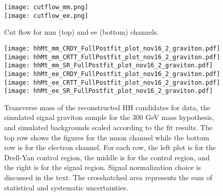 \begin{figure}[tbp]
  \begin{center}
    \texttt{[image: cutflow\_mm.png]}\\
    \texttt{[image: cutflow\_ee.png]}\\
    \caption{Cut flow for mm (top) and ee (bottom) channels. }
    \label{fig:cutFlow}
  \end{center}
\end{figure}


                                                                                                                                            

\begin{figure}[tbp]
  \begin{center}
    \texttt{[image: hhMt\_mm\_CRDY\_FullPostfit\_plot\_nov16\_2\_graviton.pdf]}
    \texttt{[image: hhMt\_mm\_CRTT\_FullPostfit\_plot\_nov16\_2\_graviton.pdf]}
    \texttt{[image: hhMt\_mm\_SR\_FullPostfit\_plot\_nov16\_2\_graviton.pdf]} \\
    \texttt{[image: hhMt\_ee\_CRDY\_FullPostfit\_plot\_nov16\_2\_graviton.pdf]}
    \texttt{[image: hhMt\_ee\_CRTT\_FullPostfit\_plot\_nov16\_2\_graviton.pdf]}
    \texttt{[image: hhMt\_ee\_SR\_FullPostfit\_plot\_nov16\_2\_graviton.pdf]}
    \caption{Transverse mass of the reconstructed HH candidates for data, the simulated signal graviton sample
    for the 300 GeV mass hypothesis, and simulated backgrounds scaled according to the fit results. The top
    row shows the figures for the muon channel while the bottom row is for the electron channel. For each row,
    the left plot is for the Drell-Yan control region, the middle is for the \ttbar control region, and the right
    is for the signal region. Signal normalization choice is discussed in the text. The crosshatched area represents
    the sum of statistical and systematic uncertainties.}
    \label{fig:MCcomparisons}
%                                                                                                                 
  \end{center}
\end{figure}




